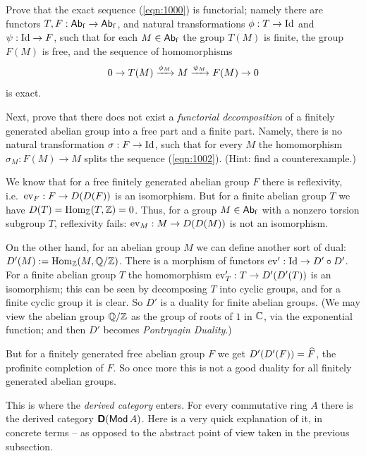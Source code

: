 \begin{exer}
Prove that the exact sequence (\ref{eqn:1000}) is functorial; 
namely there are functors 
$T, F : \operatorname{\mathsf{Ab}}_{\mathrm{f}} \to \operatorname{\mathsf{Ab}}_{\mathrm{f}}$,
and natural transformations
$\phi : T \to \operatorname{Id}$ and  
$\psi :  \operatorname{Id} \to F$, such that for each $M \in \operatorname{\mathsf{Ab}}_{\mathrm{f}}$ 
the group $T(M)$ is finite, the group $F(M)$ is free, and 
the sequence of homomorphisms
\begin{equation} \label{eqn:1002}
0 \to T(M) \xrightarrow{\phi_M} M  \xrightarrow{\psi_M} F(M) \to  0
\end{equation}
is exact. 

Next, prove that there does not exist a {\em functorial decomposition} of a
finitely generated abelian group into a free part and a finite part. 
Namely, there is no natural transformation
$\sigma : F \to \operatorname{Id}$, such that for every $M$ the homomorphism 
$\sigma_M : F(M) \to M$ 
splits the sequence (\ref{eqn:1002}). (Hint: find a counterexample.)
\end{exer}

We know that for a free finitely generated abelian group $F$ there is 
reflexivity, i.e.\ $\operatorname{ev}_F : F \to D(D(F))$ is an isomorphism. But for a
finite abelian group $T$ we have
$D(T) = \operatorname{Hom}_{\mathbb{Z}}(T, \mathbb{Z}) = 0$.
Thus, for a group $M \in \operatorname{\mathsf{Ab}}_{\mathrm{f}}$  with a nonzero torsion subgroup
$T$, reflexivity fails: $\operatorname{ev}_M : M \to D(D(M))$ is not an isomorphism.

On the other hand, for an abelian group $M$ we can define another sort of dual:
$D'(M) := \operatorname{Hom}_{\mathbb{Z}}(M, \mathbb{Q} / \mathbb{Z})$.
There is a morphism of functors 
$\operatorname{ev}' : \operatorname{Id} \to D' \circ D'$. 
For a finite abelian group $T$ the homomorphism 
$\operatorname{ev}'_T : T \to D'(D'(T))$ is an isomorphism; this can be seen by 
decomposing $T$ into cyclic groups, and for a finite cyclic group it is clear. 
So $D'$ is a duality for finite abelian groups.
(We may view the abelian group $\mathbb{Q} / \mathbb{Z}$ as the group of roots of $1$ in
$\mathbb{C}$, via the exponential function; and then $D'$ becomes {\em 
Pontryagin Duality}.)

But for a finitely generated free abelian group $F$ we get
$D'(D'(F)) = \widehat{F}$, the profinite completion of $F$. So once more this is
not a good duality for all finitely generated abelian groups.

This is where the {\em derived category} enters. 
For every commutative ring $A$ there is the derived category
$\boldsymbol{\mathsf{D}}(\operatorname{\mathsf{Mod}} A)$. Here is a very quick explanation of it,
in concrete terms -- as opposed to the abstract point of view taken in the 
previous subsection. 

